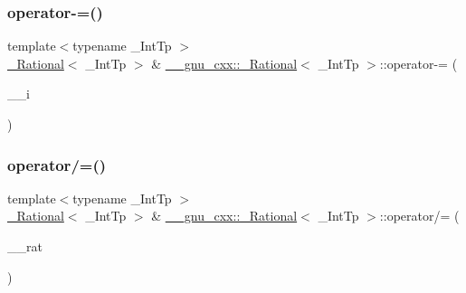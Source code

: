 \subsubsection{\texorpdfstring{operator-\/=()}{operator-=()}\hspace{0.1cm}{\footnotesize\ttfamily [2/2]}}
{\footnotesize\ttfamily template$<$typename \+\_\+\+Int\+Tp $>$ \\
\hyperlink{class____gnu__cxx_1_1__Rational}{\+\_\+\+Rational}$<$ \+\_\+\+Int\+Tp $>$ \& \hyperlink{class____gnu__cxx_1_1__Rational}{\+\_\+\+\_\+gnu\+\_\+cxx\+::\+\_\+\+Rational}$<$ \+\_\+\+Int\+Tp $>$\+::operator-\/= (\begin{DoxyParamCaption}\item[{\hyperlink{class____gnu__cxx_1_1__Rational_a7987be70fc59d0d980621fd65828b74a}{value\+\_\+type}}]{\+\_\+\+\_\+i }\end{DoxyParamCaption})\hspace{0.3cm}{\ttfamily [inline]}}

\mbox{\label{class____gnu__cxx_1_1__Rational_aad16a895b3078935d76f263c2cdf0d89}} 
\subsubsection{\texorpdfstring{operator/=()}{operator/=()}\hspace{0.1cm}{\footnotesize\ttfamily [1/2]}}
{\footnotesize\ttfamily template$<$typename \+\_\+\+Int\+Tp $>$ \\
\hyperlink{class____gnu__cxx_1_1__Rational}{\+\_\+\+Rational}$<$ \+\_\+\+Int\+Tp $>$ \& \hyperlink{class____gnu__cxx_1_1__Rational}{\+\_\+\+\_\+gnu\+\_\+cxx\+::\+\_\+\+Rational}$<$ \+\_\+\+Int\+Tp $>$\+::operator/= (\begin{DoxyParamCaption}\item[{\hyperlink{class____gnu__cxx_1_1__Rational}{\+\_\+\+Rational}$<$ \+\_\+\+Int\+Tp $>$}]{\+\_\+\+\_\+rat }\end{DoxyParamCaption})}

\mbox{\label{class____gnu__cxx_1_1__Rational_ab2c10c2d0872e1c5b4c7ae81d274aa1f}} 
